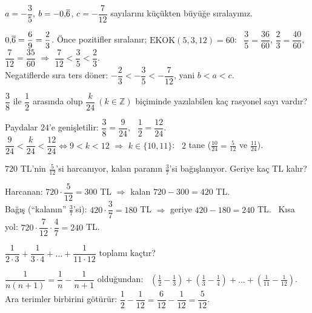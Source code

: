 \begin{alistirma}
\(a=-\dfrac{3}{5}\), \(b=-0{,}\overline{6}\), \(c=-\dfrac{7}{12}\) sayılarını küçükten büyüğe sıralayınız.
\end{alistirma}
\begin{cozum}
\(0{,}\overline{6}=\dfrac{6}{9}=\dfrac{2}{3}\). Önce pozitifler sıralanır; \(\text{EKOK}(5,3,12)=60\): \ \(\dfrac{3}{5}=\dfrac{36}{60}\), \(\dfrac{2}{3}=\dfrac{40}{60}\), \(\dfrac{7}{12}=\dfrac{35}{60}\) \(\Rightarrow\) \(\dfrac{7}{12}<\dfrac{3}{5}<\dfrac{2}{3}\).\\
Negatiflerde sıra ters döner: \(-\dfrac{2}{3}<-\dfrac{3}{5}<-\dfrac{7}{12}\), yani \(b<a<c\).
\end{cozum}

\begin{alistirma}
\(\dfrac{3}{8}\) ile \(\dfrac{1}{2}\) arasında olup \(\dfrac{k}{24}\ (k\in\mathbb{Z})\) biçiminde yazılabilen kaç rasyonel sayı vardır?
\end{alistirma}
\begin{cozum}
Paydalar \(24\)'e genişletilir: \(\dfrac{3}{8}=\dfrac{9}{24}\), \ \(\dfrac{1}{2}=\dfrac{12}{24}\).\\
\(\dfrac{9}{24}<\dfrac{k}{24}<\dfrac{12}{24}\iff 9<k<12\) \(\Rightarrow\) \(k\in\{10,11\}\): \ \(2\) tane (\(\frac{10}{24}=\frac{5}{12}\) ve \(\frac{11}{24}\)).
\end{cozum}

\begin{alistirma}
\(720\) TL'nin \(\frac{5}{12}\)'si harcanıyor, kalan paranın \(\frac{3}{7}\)'si bağışlanıyor. Geriye kaç TL kalır?
\end{alistirma}
\begin{cozum}
Harcanan: \(720\cdot\dfrac{5}{12}=300\) TL \(\Rightarrow\) kalan \(720-300=420\) TL.\\
Bağış (``kalanın'' \(\frac{3}{7}\)'si): \(420\cdot\dfrac{3}{7}=180\) TL \(\Rightarrow\) geriye \(420-180=240\) TL. \ Kısa yol: \(720\cdot\dfrac{7}{12}\cdot\dfrac{4}{7}=240\) TL.
\end{cozum}

\begin{alistirma}
\(\dfrac{1}{2\cdot 3}+\dfrac{1}{3\cdot 4}+\dots+\dfrac{1}{11\cdot 12}\) toplamı kaçtır?
\end{alistirma}
\begin{cozum}
\(\dfrac{1}{n(n+1)}=\dfrac{1}{n}-\dfrac{1}{n+1}\) olduğundan: \ \(\left(\frac{1}{2}-\frac{1}{3}\right)+\left(\frac{1}{3}-\frac{1}{4}\right)+\dots+\left(\frac{1}{11}-\frac{1}{12}\right)\).\\
Ara terimler birbirini götürür: \(\dfrac{1}{2}-\dfrac{1}{12}=\dfrac{6}{12}-\dfrac{1}{12}=\dfrac{5}{12}\).
\end{cozum}

